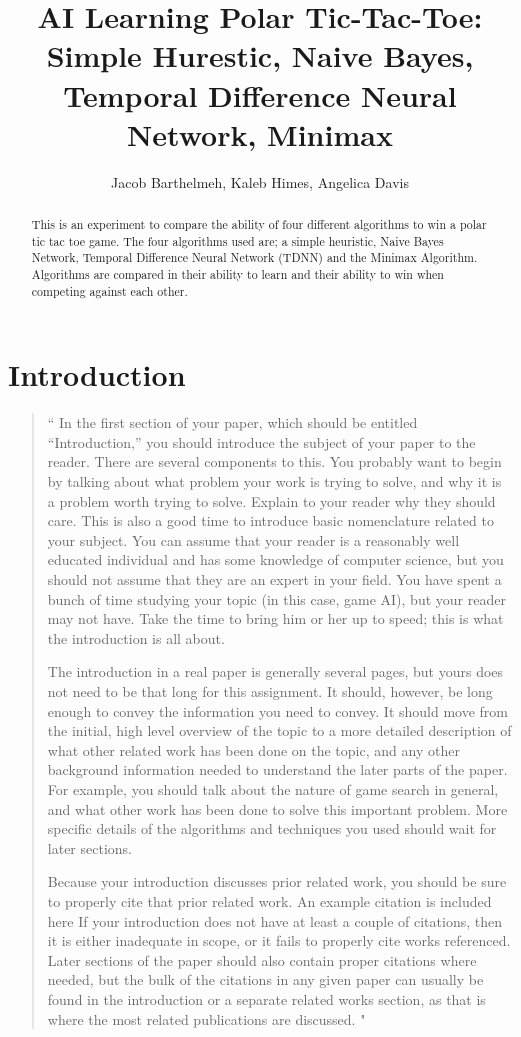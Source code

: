 \documentclass[12pt,letterpaper]{article}
\title{AI Learning Polar Tic-Tac-Toe: \\ Simple Hurestic, Naive Bayes, Temporal Difference Neural Network, Minimax}
\author{Jacob Barthelmeh, Kaleb Himes, Angelica Davis}
\begin{document}
\maketitle

\begin{abstract}
This is an experiment to compare the ability of four different algorithms to win a polar tic tac toe game. The four algorithms used are; a simple heuristic, Naive Bayes Network, Temporal Difference Neural Network (TDNN) and the Minimax Algorithm. Algorithms are compared in their ability to learn and their ability to win when competing against each other.
\end{abstract}

\section{Introduction}
\begin{quote}
`` 
In the first section of your paper, which should be entitled ``Introduction,''
you should introduce the subject of your paper to the reader.  There are several
components to this.  You probably want to begin by talking about what problem
your work is trying to solve, and why it is a problem worth trying to solve.
Explain to your reader why they should care.  This is also a good time to
introduce basic nomenclature related to your subject.  You can assume that your
reader is a reasonably well educated individual and has some knowledge of
computer science, but you should not assume that they are an expert in your field.  You have
spent a bunch of time studying your topic (in this case, game AI), but
your reader may not have.  Take the time to bring him or her up to speed; this
is what the introduction is all about.

The introduction in a real paper is generally several pages, but yours does not
need to be that long for this assignment.  It should, however, be long enough to
convey the information you need to convey.  It should move from the initial, high level
overview of the topic to a more detailed description of what other related work
has been done on the topic, and any other background information needed to
understand the later parts of the paper.  For example, you should talk about the nature
of game search in general, and what other work has been
done to solve this important problem.  More specific details of the algorithms and
techniques you used should wait for later sections.

Because your introduction discusses prior related work, you should be sure to
properly cite that prior related work. An example citation is included here
If your introduction does not have at
least a couple of citations, then it is either inadequate in scope, or it fails
to properly cite works referenced.  Later sections of the
paper should also contain proper citations where needed, but the bulk of the
citations in any given paper can usually be found in the introduction or a 
separate related works section, as that
is where the most related publications are discussed.
"
\end{quote}
\end{document}
